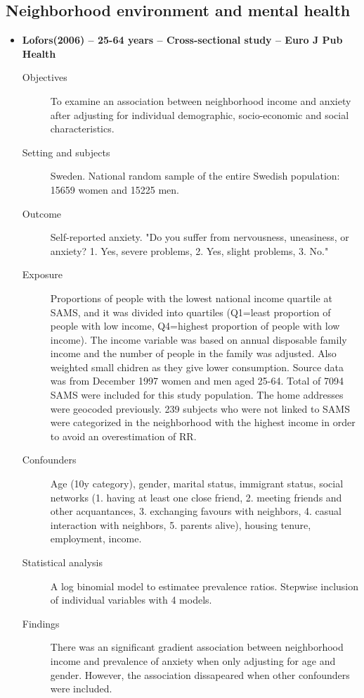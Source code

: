 \documentclass{article}
\begin{document}
\subsection{Neighborhood environment and mental health}
\begin{itemize}
	\item{\bf Lofors(2006) -- 25-64 years -- Cross-sectional study -- Euro J Pub Health} 
		\begin{description}
			\item[Objectives]
				To examine an association between neighborhood income and anxiety after adjusting for individual demographic, socio-economic and social characteristics.
			\item[Setting and subjects] 
				Sweden. National random sample of the entire Swedish population: 15659 women and 15225 men.
			\item[Outcome]
				Self-reported anxiety. "Do you suffer from nervousness, uneasiness, or anxiety? 1. Yes, severe problems, 2. Yes, slight problems, 3. No."
			\item[Exposure] 
				Proportions of people with the lowest national income quartile at SAMS, and it was divided into quartiles (Q1=least proportion of people with low income, Q4=highest proportion of people with low income). The income variable was based on annual disposable family income and the number of people in the family was adjusted. Also weighted small chidren as they give lower consumption. Source data was from December 1997 women and men aged 25-64. Total of 7094 SAMS were included for this study population. The home addresses were geocoded previously. 239 subjects who were not linked to SAMS were categorized in the neighborhood with the highest income in order to avoid an overestimation of RR.
			\item[Confounders] 
				Age (10y category), gender, marital status, immigrant status, social networks (1. having at least one close friend, 2. meeting friends and other acquantances, 3. exchanging favours with neighbors, 4. casual interaction with neighbors, 5. parents alive), housing tenure, employment, income.
			\item[Statistical analysis] 
				A log binomial model to estimatee prevalence ratios. Stepwise inclusion of individual variables with 4 models.
			\item[Findings] 
				There was an significant gradient association between neighborhood income and prevalence of anxiety when only adjusting for age and gender. However, the association dissapeared when other confounders were included.

\end{description}
\end{itemize}
\end{document}

